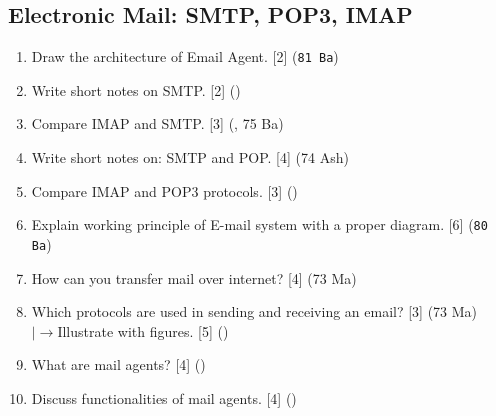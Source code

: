 \documentclass[12pt]{article}
\newcommand{\lb}{\\$\left|\rightarrow\right.$}
\begin{document}
	\subsection{Electronic Mail: SMTP, POP3, IMAP}
		\begin{enumerate}[noitemsep, topsep=0pt]
			\item Draw the architecture of Email Agent. \hfill [2] (\texttt{81 Ba})

			\item Write short notes on SMTP. \hfill [2] ()

			\item Compare IMAP and SMTP. \hfill [3] (, 75 Ba)

			\item Write short notes on: SMTP and POP. \hfill [4] (74 Ash)

			\item Compare IMAP and POP3 protocols. \hfill [3] ()

			\item Explain working principle of E-mail system with a proper diagram. \hfill [6] (\texttt{80 Ba})

			\item How can you transfer mail over internet? \hfill [4] (73 Ma)

			\item Which protocols are used in sending and receiving an email? \hfill [3] (73 Ma)
			\lb Illustrate with figures. \hfill [5] ()

			\item What are mail agents? \hfill [4] ()

			\item Discuss functionalities of mail agents. \hfill [4] ()
		\end{enumerate}
\end{document}

